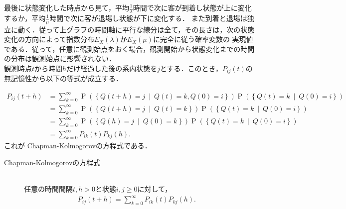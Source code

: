 \documentclass[a4j,papersize,disablejfam,slide,14pt]{jsarticle}
\def\cprob#1#2{\operatorname{P} \left(\left\{ #1 \ \middle|\ #2 \right\}\right)} %
\begin{document}
    最後に状態変化した時点から見て，平均$\frac{1}{\lambda}$時間で次に客が到着し状態が上に変化するか，平均$\frac{1}{\mu}$時間で次に客が退場し状態が下に変化する．
    また到着と退場は独立に動く．従って上グラフの時間軸に平行な線分は全て，その長さは，次の状態変化の方向によって指数分布$E_X(\lambda)$か$E_X(\mu)$に完全に従う確率変数の
    実現値である．従って，任意に観測始点をおく場合，観測開始から状態変化までの時間の分布は観測始点に影響されない．\\
    観測時点$t$から時間$h$だけ経過した後の系内状態を$j$とする．このとき，$P_{ij}(t)$の無記憶性から以下の等式が成立する．

    \begin{align}
    	P_{ij}(t+h) &= \sum_{k=0}^{\infty} \cprob{Q(t+h) = j}{Q(t) = k, Q(0) = i}\cprob{Q(t) = k}{Q(0) = i} \\
        &= \sum_{k=0}^{\infty} \cprob{Q(t+h) = j}{Q(t) = k}\cprob{Q(t) = k}{Q(0) = i} \\
        &= \sum_{k=0}^{\infty} \cprob{Q(h) = j}{Q(0) = k}\cprob{Q(t) = k}{Q(0) = i} \\
        &= \sum_{k=0}^{\infty} P_{ik}(t)P_{kj}(h).
    \end{align}
    これが {\rm Chapman-Kolmogorov}の方程式である．
    \begin{screen}
    	\begin{description}
        	\item[{\rm Chapman-Kolmogorov}の方程式]\mbox{}\\
            	任意の時間間隔$t,h > 0$と状態$i,j \geq 0$に対して，
                \begin{align}
            		P_{ij}(t+h) = \sum_{k=0}^{\infty} P_{ik}(t)P_{kj}(h). & \label{eq:chapman-kolmogorov}
                \end{align}
        \end{description}
    \end{screen}
\end{document}
